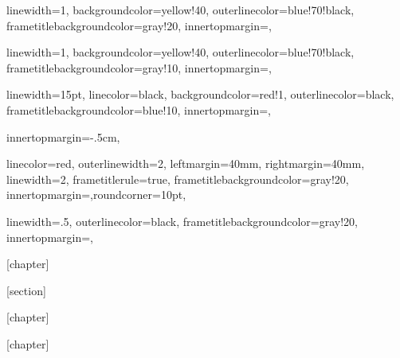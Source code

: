 \newenvironment{acknol}{
  \chapter*{Acknoledgements}
  \setstretch{1.3}
}
{
\clearpage
}


{linewidth=1,
backgroundcolor=yellow!40,
outerlinecolor=blue!70!black,
frametitlebackgroundcolor=gray!20,
innertopmargin=\topskip,}


{linewidth=1,
backgroundcolor=yellow!40,
outerlinecolor=blue!70!black,
frametitlebackgroundcolor=gray!10,
innertopmargin=\topskip,}

{linewidth=15pt,
linecolor=black,
backgroundcolor=red!1,
outerlinecolor=black,
frametitlebackgroundcolor=blue!10,
innertopmargin=\topskip,}

{%
innertopmargin=-.5cm,}

{linecolor=red,
outerlinewidth=2,
leftmargin=40mm,
rightmargin=40mm,
linewidth=2,
frametitlerule=true,
frametitlebackgroundcolor=gray!20,
innertopmargin=\topskip,roundcorner=10pt,}

{linewidth=.5,
outerlinecolor=black,
frametitlebackgroundcolor=gray!20,
innertopmargin=\topskip,}



[chapter]

[section]


[chapter]

[chapter]


